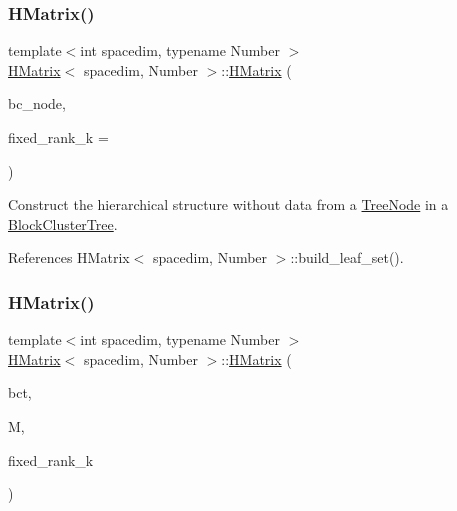 \mbox{\label{classHMatrix_a4fe44a3aa2b813f593b787f24be56a1c}} 
\subsubsection{\texorpdfstring{H\+Matrix()}{HMatrix()}\hspace{0.1cm}{\footnotesize\ttfamily [3/11]}}
{\footnotesize\ttfamily template$<$int spacedim, typename Number $>$ \\
\hyperlink{classHMatrix}{H\+Matrix}$<$ spacedim, Number $>$\+::\hyperlink{classHMatrix}{H\+Matrix} (\begin{DoxyParamCaption}\item[{typename \hyperlink{classBlockClusterTree}{Block\+Cluster\+Tree}$<$ spacedim, Number $>$\+::node\+\_\+const\+\_\+pointer\+\_\+type}]{bc\+\_\+node,  }\item[{const unsigned int}]{fixed\+\_\+rank\+\_\+k = {} }\end{DoxyParamCaption})}

Construct the hierarchical structure without data from a \hyperlink{classTreeNode}{Tree\+Node} in a \hyperlink{classBlockClusterTree}{Block\+Cluster\+Tree}. 

References H\+Matrix$<$ spacedim, Number $>$\+::build\+\_\+leaf\+\_\+set().

\mbox{\label{classHMatrix_ad3a62fe726b69cbde07b1f434417d318}} 
\subsubsection{\texorpdfstring{H\+Matrix()}{HMatrix()}\hspace{0.1cm}{\footnotesize\ttfamily [4/11]}}
{\footnotesize\ttfamily template$<$int spacedim, typename Number $>$ \\
\hyperlink{classHMatrix}{H\+Matrix}$<$ spacedim, Number $>$\+::\hyperlink{classHMatrix}{H\+Matrix} (\begin{DoxyParamCaption}\item[{const \hyperlink{classBlockClusterTree}{Block\+Cluster\+Tree}$<$ spacedim, Number $>$ \&}]{bct,  }\item[{const \hyperlink{classLAPACKFullMatrixExt}{L\+A\+P\+A\+C\+K\+Full\+Matrix\+Ext}$<$ Number $>$ \&}]{M,  }\item[{const unsigned int}]{fixed\+\_\+rank\+\_\+k }\end{DoxyParamCaption})}

